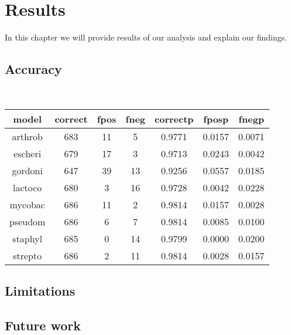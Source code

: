 \chapter{Results}

In this chapter we will provide results of our analysis and explain our findings.

\section{Accuracy}
\\
\begin{tabular}{| c | c | c | c | c | c | c |}
\hline
model & correct & fpos & fneg & correctp	& fposp & fnegp \\
\hline
arthrob & 683 & 11 & 5  & 0.9771 & 0.0157 & 0.0071 \\
escheri & 679 & 17 & 3  & 0.9713 & 0.0243 & 0.0042 \\
gordoni & 647 & 39 & 13 & 0.9256 & 0.0557 & 0.0185 \\
lactoco & 680 & 3  & 16 & 0.9728 & 0.0042 & 0.0228 \\
mycobac & 686 & 11 & 2  & 0.9814 & 0.0157 & 0.0028 \\
pseudom & 686 & 6  & 7  & 0.9814 & 0.0085 & 0.0100 \\
staphyl & 685 & 0  & 14 & 0.9799 & 0.0000 & 0.0200 \\
strepto & 686 & 2  & 11 & 0.9814 & 0.0028 & 0.0157 \\
\hline
\end{tabular}

\section{Limitations}
\section{Future work}